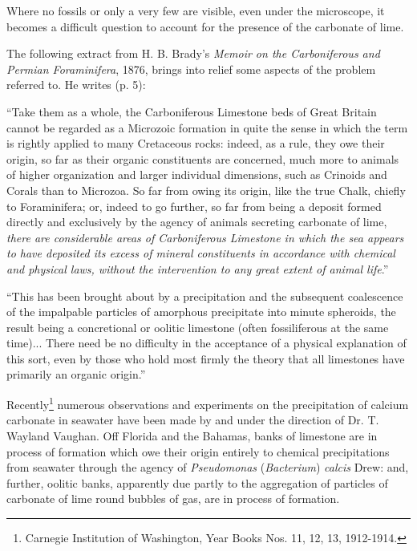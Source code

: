 \documentclass[a4paper, 12pt, oneside, landscape]{article}
\begin{document}
Where no fossils or only a very few are visible, even under the microscope, it becomes a difficult question to account for the presence of the carbonate of lime.

The following extract from H. B. Brady's \emph{Memoir on the Carboniferous and Permian Foraminifera}, 1876, brings into relief some aspects of the problem referred to. He writes (p. 5):

``Take them as a whole, the Carboniferous Limestone beds of Great Britain cannot be regarded as a Microzoic formation in quite the sense in which the term is rightly applied to many Cretaceous rocks: indeed, as a rule, they owe their origin, so far as their organic constituents are concerned, much more to animals of higher organization and larger individual dimensions, such as Crinoids and Corals than to Microzoa. So far from owing its origin, like the true Chalk, chiefly to Foraminifera; or, indeed to go further, so far from being a deposit formed directly and exclusively by the agency of animals secreting carbonate of lime, \emph{there are considerable areas of Carboniferous Limestone in which the sea appears to have deposited its excess of mineral constituents in accordance with chemical and physical laws, without the intervention to any great extent of animal life}.''

``This has been brought about by a precipitation and the subsequent coalescence of the impalpable particles of amorphous precipitate into minute spheroids, the result being a concretional or oolitic limestone (often fossiliferous at the same time)... There need be no difficulty in the acceptance of a physical explanation of this sort, even by those who hold most firmly the theory that all limestones have primarily an organic origin.''

Recently\footnote{Carnegie Institution of Washington, Year Books Nos. 11, 12, 13, 1912-1914.} numerous observations and experiments on the precipitation of calcium carbonate in seawater have been made by and under the direction of Dr. T. Wayland Vaughan. Off Florida and the Bahamas, banks of limestone are in process of formation which owe their origin entirely to chemical precipitations from seawater through the agency of \emph{Pseudomonas} (\emph{Bacterium}) \emph{calcis} Drew: and, further, oolitic banks, apparently due partly to the aggregation of particles of carbonate of lime round bubbles of gas, are in process of formation.
\end{document}
